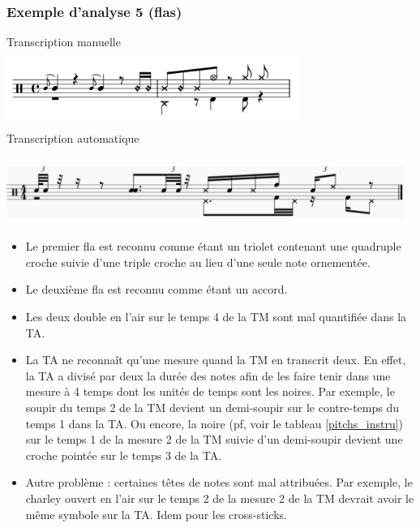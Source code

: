\subsubsection{Exemple d’analyse 5 (flas)}
\label{flas}
Transcription manuelle\\
\includegraphics[height=25mm, width=95mm]{
z_images/4_experimentations/1_analyses/2_flas/0_124_funk_95_fill_4-4.png}\\
Transcription automatique\\\\
\includegraphics[height=20mm, width=130mm]{
z_images/4_experimentations/1_analyses/2_flas/1_124_funk_95_fill_4-4.png}\\

\begin{itemize}
	\item Le premier fla est reconnu comme étant un triolet contenant une
        quadruple croche suivie d’une triple croche au lieu d’une seule note
        ornementée.
	\item Le deuxième fla est reconnu comme étant un accord.
	\item Les deux double en l’air sur le temps 4 de la TM sont mal quantifiée
        dans la TA. 
	\item La TA ne reconnaît qu’une mesure quand la TM en transcrit deux. En
        effet, la TA a divisé par deux la durée des notes afin de les faire
        tenir dans une mesure à 4 temps dont les unités de temps sont les
        noires. Par exemple, le soupir du temps 2 de la TM devient un
        demi-soupir sur le contre-temps du temps 1 dans la TA. Ou encore, la
        noire (pf, voir le tableau \ref{pitchs_instru}) sur le temps 1 de la
        mesure 2 de la TM suivie d’un demi-soupir devient une croche pointée
        sur le temps 3 de la TA.
	\item Autre problème : certaines têtes de notes sont mal attribuées. Par
        exemple, le charley ouvert en l’air sur le temps 2 de la mesure 2 de
        la TM devrait avoir le même symbole sur la TA. Idem pour les
        cross-sticks.
\end{itemize}


